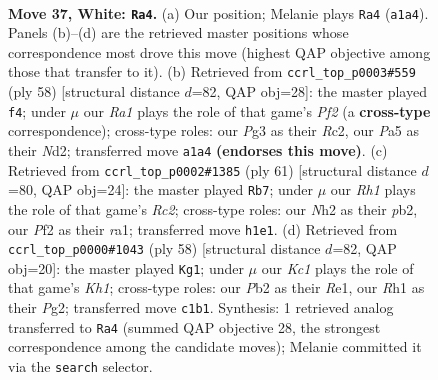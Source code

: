 \documentclass[11pt]{article}
\begin{document}
\clearpage

\begin{figure}[p]\centering
\begin{subfigure}{0.46\textwidth}\centering
\resizebox{\linewidth}{!}{%
\newchessgame
\chessboard[
  setfen={1k6/rp2b1pr/p1p1b2p/P4p2/2pP3P/2B1P1P1/1P3P1N/R1K4R w - - 1 37},
  showmover=false,
  pgfstyle=straightmove, color=movearrow, markmove={a1-a4}
]}
\caption{}
\end{subfigure}\hfill
\begin{subfigure}{0.46\textwidth}\centering
\resizebox{\linewidth}{!}{%
\newchessgame
\chessboard[
  setfen={1r1r2k1/3b1pp1/B2bp2p/p2p4/Pp1P4/1P2P3/2RN1PPP/2R3K1 w - - 1 30},
  showmover=false,
  pgfstyle=straightmove, color=movearrow, markmove={f2-f4}
]}
\caption{}
\end{subfigure}
\\[4pt]
\begin{subfigure}{0.46\textwidth}\centering
\resizebox{\linewidth}{!}{%
\newchessgame
\chessboard[
  setfen={7r/2r1kp2/2b1p1p1/pp1pP2p/5P2/P1PBK1PP/1P1R4/R7 b - - 6 31},
  showmover=false,
  pgfstyle=straightmove, color=movearrow, markmove={c7-b7}
]}
\caption{}
\end{subfigure}\hfill
\begin{subfigure}{0.46\textwidth}\centering
\resizebox{\linewidth}{!}{%
\newchessgame
\chessboard[
  setfen={3rrbk1/p4p2/1p1ppP1p/7p/P1PBP3/1P6/6PP/4RR1K w - - 0 30},
  showmover=false,
  pgfstyle=straightmove, color=movearrow, markmove={h1-g1}
]}
\caption{}
\end{subfigure}
\caption{\textbf{Move 37, White: \texttt{Ra4}.} (a) Our position; Melanie plays \texttt{Ra4} (\texttt{a1a4}). Panels (b)--(d) are the retrieved master positions whose correspondence most drove this move (highest QAP objective among those that transfer to it). (b) Retrieved from \texttt{ccrl\_top\_p0003\#559} (ply 58) [structural distance $d$=82, QAP obj=28]: the master played \texttt{f4}; under $\mu$ our \emph{Ra1} plays the role of that game's \emph{Pf2} (a \textbf{cross-type} correspondence); cross-type roles: our \emph{P}g3 as their \emph{R}c2, our \emph{P}a5 as their \emph{N}d2; transferred move \texttt{a1a4} \textbf{(endorses this move)}. (c) Retrieved from \texttt{ccrl\_top\_p0002\#1385} (ply 61) [structural distance $d$=80, QAP obj=24]: the master played \texttt{Rb7}; under $\mu$ our \emph{Rh1} plays the role of that game's \emph{Rc2}; cross-type roles: our \emph{N}h2 as their \emph{p}b2, our \emph{P}f2 as their \emph{r}a1; transferred move \texttt{h1e1}. (d) Retrieved from \texttt{ccrl\_top\_p0000\#1043} (ply 58) [structural distance $d$=82, QAP obj=20]: the master played \texttt{Kg1}; under $\mu$ our \emph{Kc1} plays the role of that game's \emph{Kh1}; cross-type roles: our \emph{P}b2 as their \emph{R}e1, our \emph{R}h1 as their \emph{P}g2; transferred move \texttt{c1b1}. Synthesis: 1 retrieved analog transferred to \texttt{Ra4} (summed QAP objective 28, the strongest correspondence among the candidate moves); Melanie committed it via the \texttt{search} selector.}
\label{fig:thought-m72}
\end{figure}
\end{document}
